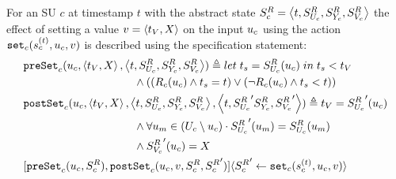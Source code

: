 \begin{definition}\label{def:setin}
  For an SU $c$ at timestamp $t$ with the abstract state $S^{R}_{c} =  \left\langle t,S^{R}_{U_{c}}, S^{R}_{Y_{c}}, S^{R}_{V_c} \right\rangle $ the effect of 
  setting a value $v =  \left\langle t_{V}, X \right\rangle $ on the input $u_{c}$ using the action $\mathtt{set}_{c}(s_{c}^{(t)}, u_{c}, v)$ is described using the specification statement:
    \begin{align}
      &\mathtt{preSet}_{c}(u_{c},  \left\langle t_{V},X \right\rangle ,  \left\langle t,S^{R}_{U_{c}}, S^{R}_{Y_{c}}, S^{R}_{V_c} \right\rangle ) \triangleq 
      let\; t_s = S^{R}_{U_{c}}(u_{c}) \; in \; t_s < t_{V} \nonumber \\
      & \qquad \qquad \qquad \qquad \qquad
      \land 
      ((R_{c}(u_{c}) \land t_s = t) 
      \lor (\neg R_{c}(u_{c}) \land t_s < t)) \nonumber \\
      &\mathtt{postSet}_{c}(u_{c},  \left\langle t_{V},X \right\rangle ,  \left\langle t,S^{R}_{U_{c}}, S^{R}_{Y_{c}}, S^{R}_{V_c} \right\rangle , 
       \left\langle t, {S^{R}_{U_{c}}}' S^{R}_{Y_{c}}, {S^{R}_{V_c}}' \right\rangle ) \triangleq 
      t_{V} = {S^{R}_{U_{c}}}'(u_{c})
      \nonumber\\
      &\qquad \qquad \qquad \qquad \qquad \land
      \forall u_{m} \in (U_{c} \setminus u_{c}) \cdot 
      {S^{R}_{U_{c}}}'(u_{m}) =
      S^{R}_{U_{c}}(u_{m}) 
      \nonumber \\
      &\qquad \qquad \qquad \qquad \qquad \land
      {S^{R}_{V_c}}'(u_{c}) = X \nonumber\\
      &[\mathtt{preSet}_{c}(u_{c}, S^{R}_{c}), 
      \mathtt{postSet}_{c}(u_{c}, v, S^{R}_{c}, {S^{R}_{c}}')] 
      \langle {S^{R}_{c}}' \gets \mathtt{set}_{c}(s_{c}^{(t)},u_{c}, v) \rangle \nonumber
    \end{align}
  \end{definition}


